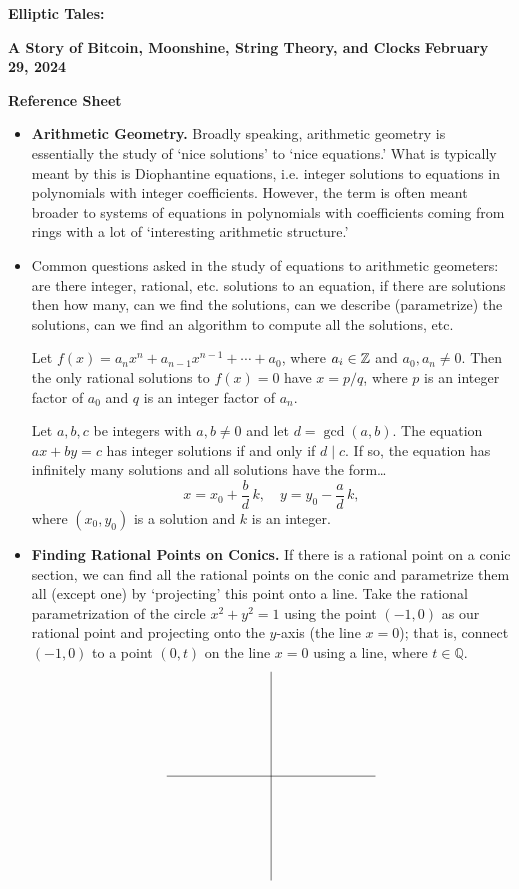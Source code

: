\documentclass[11pt,letterpaper]{article}
\begin{document}
\begin{center}
{\bfseries\Large Elliptic Tales:} \par 
{\bfseries\large A Story of Bitcoin, Moonshine, String Theory, and Clocks} \pspace
{\bfseries\large February 29, 2024} \par\vspace{1cm}
{\large \bfseries Reference Sheet}
\end{center}

\begin{itemize}
\item {\bfseries Arithmetic Geometry.} Broadly speaking, arithmetic geometry is essentially the study of `nice solutions' to `nice equations.' What is typically meant by this is Diophantine equations, i.e. integer solutions to equations in polynomials with integer coefficients. However, the term is often meant broader to systems of equations in polynomials with coefficients coming from rings with a lot of `interesting arithmetic structure.'

\item Common questions asked in the study of equations to arithmetic geometers: are there integer, rational, etc. solutions to an equation, if there are solutions then how many, can we find the solutions, can we describe (parametrize) the solutions, can we find an algorithm to compute all the solutions, etc. 

 \begin{thm*}
Let $f(x)= a_n x^n + a_{n-1} x^{n-1} + \cdots + a_0$, where $a_i \in \mathbb{Z}$ and $a_0,a_n \neq 0$. Then the only rational solutions to $f(x)=0$ have $x= p/q$, where $p$ is an integer factor of $a_0$ and $q$ is an integer factor of $a_n$. 
\end{thm*}

\begin{thm*}
Let $a, b, c$ be integers with $a, b \neq 0$ and let $d= \gcd(a, b)$. The equation $ax + by= c$ has integer solutions if and only if $d \mid c$. If so, the equation has infinitely many solutions and all solutions have the form\dots
	\[
	x= x_0 + \frac{b}{d} \, k, \quad y= y_0 - \frac{a}{d} \, k,
	\]
where $(x_0, y_0)$ is a solution and $k$ is an integer. 
\end{thm*}

\item {\bfseries Finding Rational Points on Conics.} If there is a rational point on a conic section, we can find all the rational points on the conic and parametrize them all (except one) by `projecting' this point onto a line. Take the rational parametrization of the circle $x^2 + y^2= 1$ using the point $(-1, 0)$ as our rational point and projecting onto the $y$-axis (the line $x= 0$); that is, connect $(-1, 0)$ to a point $(0, t)$ on the line $x= 0$ using a line, where $t \in \mathbb{Q}$.
	\[
	\begin{tikzpicture}[scale=1.75]
	\draw (-1.5,0) -- (1.5,0);
	\draw (0,-1.5) -- (0,1.5);


\end{tikzpicture}\]
\end{itemize}
\end{document}
